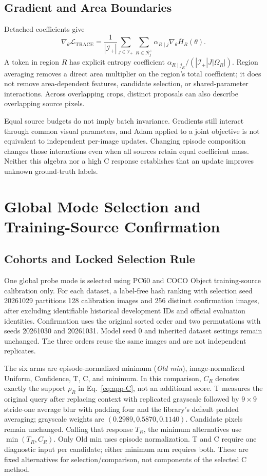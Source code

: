 \subsection{Gradient and Area Boundaries}
Detached coefficients give
\begin{equation}
\nabla_\theta\mathcal L_{\mathrm{TRACE}}
=\frac1{|\mathcal I_+|}\sum_{j\in\mathcal I_+}
\sum_{R\in\mathcal R_j^+}\alpha_{R\mid j}
\nabla_\theta\overline H_R(\theta).
\end{equation}
A token in region $R$ has explicit entropy coefficient
$\alpha_{R\mid j_R}/(|\mathcal I_+|J|\Omega_R|)$.
Region averaging removes a direct area multiplier on the region's total coefficient; it does not remove area-dependent features, candidate selection, or shared-parameter interactions. Across overlapping crops, distinct proposals can also describe overlapping source pixels.

Equal source budgets do not imply batch invariance. Gradients still interact through common visual parameters, and Adam applied to a joint objective is not equivalent to independent per-image updates. Changing episode composition changes those interactions even when all sources retain equal coefficient mass. Neither this algebra nor a high C response establishes that an update improves unknown ground-truth labels.

\section{Global Mode Selection and Training-Source Confirmation}
\label{app:selection}
\subsection{Cohorts and Locked Selection Rule}
One global probe mode is selected using PC60 and COCO Object training-source calibration only. For each dataset, a label-free hash ranking with selection seed 20261029 partitions 128 calibration images and 256 distinct confirmation images, after excluding identifiable historical development IDs and official evaluation identities. Confirmation uses the original sorted order and two permutations with seeds 20261030 and 20261031. Model seed 0 and inherited dataset settings remain unchanged. The three orders reuse the same images and are not independent replicates.

The six arms are episode-normalized minimum (\emph{Old min}), image-normalized Uniform, Confidence, T, C, and minimum. In this comparison, $C_R$ denotes exactly the support $\rho_R$ in Eq.~\ref{eq:app-C}, not an additional score. T measures the original query after replacing context with replicated grayscale followed by $9\times9$ stride-one average blur with padding four and the library's default padded averaging; grayscale weights are $(0.2989,0.5870,0.1140)$. Candidate pixels remain unchanged. Calling that response $T_R$, the minimum alternatives use $\min(T_R,C_R)$. Only Old min uses episode normalization. T and C require one diagnostic input per candidate; either minimum arm requires both. These are fixed alternatives for selection/comparison, not components of the selected C method.

